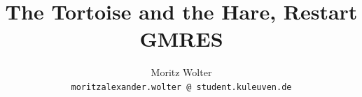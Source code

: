 








\title{The Tortoise and the Hare, Restart GMRES}

\author[Moritz Wolter]{Moritz Wolter \texorpdfstring{\\}{} {\small\texttt{moritzalexander.wolter @ student.kuleuven.de}}}


